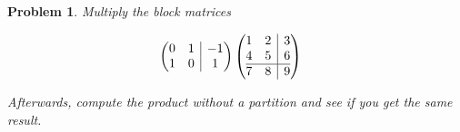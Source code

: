 \documentclass{article}
\newtheorem{problem}{Problem}
\begin{document}
\begin{problem}
Multiply the block matrices

\begin{align*}
& \left(
\begin{array}{@{}cc|c@{}}
0 & 1 & -1 \\ 1 & 0 & 1
\end{array}
\right)
\left(
\begin{array}{@{}cc|c@{}}
1 & 2 & 3 \\ 4 & 5 & 6 \\ \hline 7 & 8 & 9
\end{array}
\right) 
\end{align*}

Afterwards, compute the product without a partition and see if you get the same result.
\end{problem}
\end{document}

